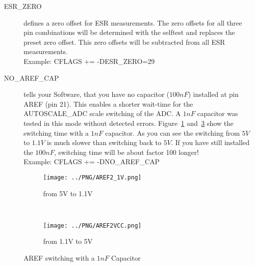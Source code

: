 \begin{description}
  \item[ESR\_ZERO] defines a zero offset for ESR measurements.
The zero offsets for all three pin combinations will be determined with the selftest and replaces the preset zero offset.
This zero offsets will be subtracted from all ESR measurements.\\
Example: CFLAGS += -DESR\_ZERO=29

  \item[NO\_AREF\_CAP] tells your Software, that you have no capacitor (\(100nF\)) installed at pin AREF (pin 21).
This enables a shorter wait-time for the AUTOSCALE\_ADC scale switching of the ADC.
A \(1nF\) capacitor was tested in this mode without detected errors.
Figure~\ref{pic:aref1} and~\ref{pic:aref5} show the switching time with a \(1nF\) capacitor.
As you can see the switching from \(5V\) to \(1.1V\) is much slower than switching back to \(5V\). If you
have still installed the \(100nF\), switching time will be about factor 100 longer!\\
Example: CFLAGS += -DNO\_AREF\_CAP

\end{description}

\begin{figure}[H]
  \begin{subfigure}[b]{.5\textwidth}
    \centering
    \texttt{[image: ../PNG/AREF2\_1V.png]}
    \caption{from 5V to 1.1V }
    \label{pic:aref1}
  \end{subfigure}
  ~
  \begin{subfigure}[b]{.5\textwidth}
    \centering
    \texttt{[image: ../PNG/AREF2VCC.png]}
    \caption{from 1.1V to 5V}
    \label{pic:aref5}
  \end{subfigure}
  \caption{AREF switching with a \(1nF\) Capacitor}
\end{figure}

